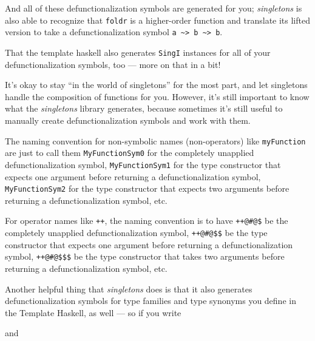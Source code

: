 \documentclass[]{article}
\newenvironment{Shaded}{}{}
\newcommand{\FunctionTok}[1]{\textcolor[rgb]{0.02,0.16,0.49}{#1}}
\newcommand{\NormalTok}[1]{#1}
\begin{document}
And all of these defunctionalization symbols are generated for you;
\emph{singletons} is also able to recognize that \texttt{foldr} is a
higher-order function and translate its lifted version to take a
defunctionalization symbol
\texttt{a\ \textasciitilde{}\textgreater{}\ b\ \textasciitilde{}\textgreater{}\ b}.

That the template haskell also generates \texttt{SingI} instances for all of
your defunctionalization symbols, too --- more on that in a bit!

It's okay to stay ``in the world of singletons'' for the most part, and let
singletons handle the composition of functions for you. However, it's still
important to know what the \emph{singletons} library generates, because
sometimes it's still useful to manually create defunctionalization symbols and
work with them.

The naming convention for non-symbolic names (non-operators) like
\texttt{myFunction} are just to call them \texttt{MyFunctionSym0} for the
completely unapplied defunctionalization symbol, \texttt{MyFunctionSym1} for the
type constructor that expects one argument before returning a
defunctionalization symbol, \texttt{MyFunctionSym2} for the type constructor
that expects two arguments before returning a defunctionalization symbol, etc.

For operator names like \texttt{++}, the naming convention is to have
\texttt{++@\#@\$} be the completely unapplied defunctionalization symbol,
\texttt{++@\#@\$\$} be the type constructor that expects one argument before
returning a defunctionalization symbol, \texttt{++@\#@\$\$\$} be the type
constructor that takes two arguments before returning a defunctionalization
symbol, etc.

Another helpful thing that \emph{singletons} does is that it also generates
defunctionalization symbols for type families and type synonyms you define in
the Template Haskell, as well --- so if you write

\begin{Shaded}
\end{Shaded}

and

\begin{Shaded}
\end{Shaded}
\end{document}
